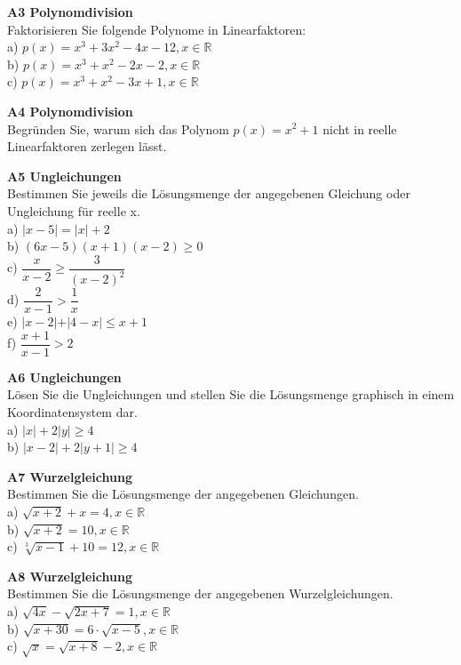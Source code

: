 \documentclass[landscape,twocolumn,a4paper]{article}
\begin{document}
 \textbf{A3 Polynomdivision} \\
 Faktorisieren Sie folgende Polynome in Linearfaktoren: \\
 a) $p(x) = x^3+3x^2-4x-12, x \in \mathbb{R}$ \\
 b) $p(x) = x^3 + x^2 -2x-2,    x \in \mathbb{R}$ \\
 c) $p(x) = x^3 + x^2 -3x+1,    x \in \mathbb{R}$ 
 \bigskip
 
 \textbf{A4 Polynomdivision} \\
Begründen Sie, warum sich das Polynom $p(x) = x^2 +1$ nicht in reelle Linearfaktoren zerlegen lässt.
 \bigskip
 
 \textbf{A5 Ungleichungen} \\
 Bestimmen Sie jeweils die Lösungsmenge der angegebenen Gleichung oder Ungleichung für reelle x.\\
 a) $\vert x- 5 \vert = \vert x \vert +2 $ \\
 b) $(6x-5)(x+1)(x-2) \ge 0$ \\
 c) $\dfrac{x}{x-2} \ge \dfrac{3}{(x-2)^2}$ \\
 d) $\dfrac{2}{x-1} > \dfrac{1}{x}$ \\
 e) $\vert x-2 \vert + \vert 4 - x \vert \le x + 1 $ \\
 f) $\dfrac{x+1}{x-1} > 2$
 
 \newpage
 
 \textbf{A6 Ungleichungen} \\
 Lösen Sie die Ungleichungen und stellen Sie die Lösungsmenge graphisch in einem Koordinatensystem dar. \\
 a) $\vert x \vert + 2 \vert y \vert \ge 4$ \\
 b) $\vert x - 2 \vert + 2\vert y + 1 \vert \ge 4$
 \bigskip
 
 \textbf{A7 Wurzelgleichung}  \\
 Bestimmen Sie die Lösungsmenge der angegebenen Gleichungen. \\
 a) $\sqrt{x+2} + x = 4,  x \in \mathbb{R}$ \\
 b) $\sqrt{x+2} = 10,  x \in \mathbb{R}$ \\
 c) $\sqrt[3]{x-1} + 10 = 12,  x \in \mathbb{R}$ 
 \bigskip
 
  \textbf{A8 Wurzelgleichung} \\
 Bestimmen Sie die Lösungsmenge der angegebenen Wurzelgleichungen. \\
 a) $\sqrt{4x} -\sqrt{2x+7}=1,  x \in \mathbb{R}$ \\
 b) $\sqrt{x+30} = 6 \cdot \sqrt{x-5},  x \in \mathbb{R}$ \\
 c) $\sqrt{x} = \sqrt{x+8} - 2,  x \in \mathbb{R}$ 
 \bigskip
 
\end{document}

